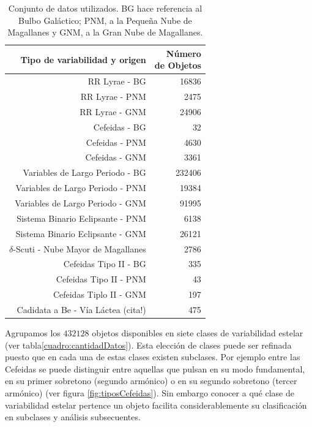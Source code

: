 \documentclass[letterpaper,12pt]{book}
\begin{document}
\begin{table}
  \centering  
  \begin{tabular}{rr}
    \hline
    \hline
    Tipo de variabilidad y origen & \shortstack{Número \\de Objetos}\\
    \hline
    \hline 
    RR Lyrae - BG\cite{soszynski_optical_2011-2} & 16836\\
    RR Lyrae - PNM \cite{soszynski_optical_2010}& 2475\\
    RR Lyrae - GNM \cite{soszynski_optical_2009-1}& 24906\\
    \hline
    Cefeidas - BG \cite{soszynski_optical_2011}& 32\\%
    Cefeidas - PNM \cite{soszynski_optical_2010-2}& 4630\\
    Cefeidas - GNM \cite{soszynski_optical_2008-1}& 3361\\
    \hline
    Variables de Largo Periodo - BG \cite{soszynski_optical_2013-1}& 232406\\
    Variables de Largo Periodo - PNM \cite{soszynski_optical_2011-1}& 19384\\
    Variables de Largo Periodo - GNM \cite{soszynski_optical_2009}& 91995\\
    \hline
    Sistema Binario Eclipsante - PNM \cite{pawlak_eclipsing_2013}& 6138\\
    Sistema Binario Eclipsante - GNM \cite{graczyk_optical_2011}& 26121\\
    \hline
    $\delta$-Scuti - Nube Mayor de Magallanes\cite{poleski_optical_2010} & 2786\\
    \hline
    Cefeidas Tipo II - BG \cite{soszynski_optical_2013}& 335\\
    Cefeidas Tipo II - PNM \cite{soszynski_optical_2010-1}& 43\\
    Cefeidas Tiplo II - GNM \cite{soszynski_optical_2008}& 197\\
    \hline
    Cadidata a Be -  Vía Láctea (cita!) & 475\\
    \hline
    \hline 
  \end{tabular} 
  \caption{Conjunto de datos utilizados. BG hace referencia al Bulbo Galáctico; PNM, a la Pequeña Nube de Magallanes y GNM, a la Gran Nube de Magallanes. }
  \label{cuadro:datosUsados}
\end{table}


Agrupamos los $432128$ objetos disponibles en siete clases de variabilidad estelar (ver tabla\ref{cuadro:cantidadDatos}). Esta elección de clases puede ser refinada puesto que en cada una de estas clases existen subclases. Por ejemplo entre las Cefeidas se puede distinguir entre aquellas que pulsan en su modo fundamental, en su primer sobretono (segundo armónico) o en su segundo sobretono (tercer armónico)  (ver figura \ref{fig:tiposCefeidas}). Sin embargo conocer a qué clase de variabilidad estelar pertence un objeto facilita considerablemente su clasificación en subclases y análisis subsecuentes. 
\end{document}
